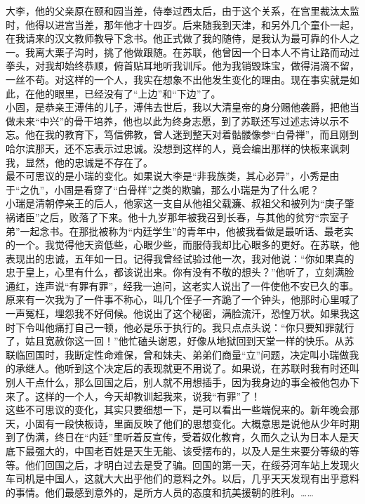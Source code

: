 大李，他的父亲原在颐和园当差，侍奉过西太后，由于这个关系，在宫里裁汰太监时，他得以进宫当差，那年他才十四岁。后来随我到天津，和另外几个童仆一起，在我请来的汉文教师教导下念书。他正式做了我的随侍，是我认为最可靠的仆人之一。我离大栗子沟时，挑了他做跟随。在苏联，他曾因一个日本人不肯让路而动过拳头，对我却始终恭顺，俯首贴耳地听我训斥。他为我销毁珠宝，做得涓滴不留，一丝不苟。对这样的一个人，我实在想象不出他发生变化的理由。现在事实就是如此，在他的眼里，已经没有了“上边”和“下边”了。\\

小固，是恭亲王溥伟的儿子，溥伟去世后，我以大清皇帝的身分赐他袭爵，把他当做未来“中兴”的骨干培养，他也以此为终身志愿，到了苏联还写过述志诗以示不忘。他在我的教育下，笃信佛教，曾人迷到整天对着骷髅像参“白骨禅”，而且刚到哈尔滨那天，还不忘表示过忠诚。没想到这样的人，竟会编出那样的快板来讽刺我，显然，他的忠诚是不存在了。\\

最不可思议的是小瑞的变化。如果说大李是“非我族类，其心必异”，小秀是由于“之仇”，小固是看穿了“白骨样”之类的欺骗，那么小瑞是为了什么呢？\\

小瑞是清朝停亲王的后人，他家这一支自从他祖父载濂、叔祖父和被列为“庚子肇祸诸臣”之后，败落了下来。他十九岁那年被我召到长春，与其他的贫穷“宗室子弟”一起念书。在那批被称为“内廷学生”的青年中，他被我看做是最听话、最老实的一个。我觉得他天资低些，心眼少些，而服侍我却比心眼多的更好。在苏联，他表现出的忠诚，五年如一日。记得我曾经试验过他一次，我对他说：“你如果真的忠于皇上，心里有什么，都该说出来。你有没有不敬的想头？”他听了，立刻满脸通红，连声说“有罪有罪”，经我一追问，这老实人说出了一件使他不安已久的事。原来有一次我为了一件事不称心，叫几个侄子一齐跪了一个钟头，他那时心里喊了一声冤枉，埋怨我不好伺候。他说出了这个秘密，满脸流汗，恐惶万状。如果我这时下令叫他痛打自己一顿，他必是乐于执行的。我只点点头说：“你只要知罪就行了，姑且宽赦你这一回！”他忙磕头谢恩，好像从地狱回到天堂一样的快乐。从苏联临回国时，我断定性命难保，曾和妹夫、弟弟们商量“立”问题，决定叫小瑞做我的承继人。他听到这个决定后的表现就更不用说了。如果说，在苏联时我有时还叫别人干点什么，那么回国之后，别人就不用想插手，因为我身边的事全被他包办下来了。这样的一个人，今天却教训起我来，说我“有罪”了！\\

这些不可思议的变化，其实只要细想一下，是可以看出一些端倪来的。新年晚会那天，小固有一段快板诗，里面反映了他们的思想变化。大概意思是说他从少年时期到了伪满，终日在“内廷”里听着反宣传，受着奴化教育，久而久之认为日本人是天底下最强大的，中国老百姓是天生无能、该受摆布的，以及人是生来要分等级的等等。他们回国之后，才明白过去是受了骗。回国的第一天，在绥芬河车站上发现火车司机是中国人，这就大大出乎他们的意料之外。以后，几乎天天发现有出乎意料的事情。他们最感到意外的，是所方人员的态度和抗美援朝的胜利。……\\

